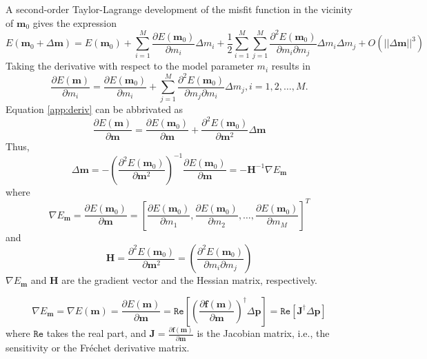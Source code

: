 A second-order Taylor-Lagrange development of the misfit function in the vicinity of $\textbf{m}_0$ gives the expression
\begin{equation}
E(\textbf{m}_0+\Delta \textbf{m})=E(\textbf{m}_0)
+\sum_{i=1}^M\frac{\partial E(\textbf{m}_0)}{\partial m_i}\Delta m_i
+\frac{1}{2}\sum_{i=1}^M\sum_{j=1}^M \frac{\partial^2 E(\textbf{m}_0)}{\partial m_i \partial m_j}\Delta m_i \Delta m_j+O(||\Delta\textbf{m}||^3)
\end{equation}
Taking the derivative with respect to the model parameter $m_i$ results in
\begin{equation}\label{app:deriv}
\frac{\partial E(\textbf{m})}{\partial m_i}=\frac{\partial E(\textbf{m}_0)}{\partial m_i}+\sum_{j=1}^M \frac{\partial^2 E(\textbf{m}_0)}{\partial m_j \partial m_i}\Delta m_j,
i=1,2,\ldots,M.
\end{equation}
Equation \eqref{app:deriv} can be abbrivated as
\begin{equation}
\frac{\partial E(\textbf{m})}{\partial \textbf{m}}=\frac{\partial E(\textbf{m}_0)}{\partial \textbf{m}}+\frac{\partial^2 E(\textbf{m}_0)}{\partial\textbf{m}^2}\Delta \textbf{m}
\end{equation}
Thus,
\begin{equation}\label{eq:deltam}
\Delta \textbf{m}=-\left(\frac{\partial^2 E(\textbf{m}_0)}{\partial\textbf{m}^2}\right)^{-1}\frac{\partial E(\textbf{m}_0)}{\partial \textbf{m}}=-\textbf{H}^{-1}\nabla E_{\textbf{m}}
\end{equation}
where 
\begin{equation}
\nabla E_{\textbf{m}}=\frac{\partial E(\textbf{m}_0)}{\partial \textbf{m}}=\left[
\frac{\partial E(\textbf{m}_0)}{\partial m_1},
\frac{\partial E(\textbf{m}_0)}{\partial m_2},
\ldots,
\frac{\partial E(\textbf{m}_0)}{\partial m_M}\right]^T
\end{equation}
and
\begin{equation}
\textbf{H}=\frac{\partial^2 E(\textbf{m}_0)}{\partial\textbf{m}^2}
=\left(\frac{\partial^2 E(\textbf{m}_0)}{\partial m_i\partial m_j}\right)
\end{equation}
$\nabla E_{\textbf{m}}$ and $\textbf{H}$ are the gradient vector and the Hessian matrix, respectively.


\begin{equation}\label{eq:grad}
\nabla E_{\textbf{m}}=\nabla E(\textbf{m})=\frac{\partial E(\textbf{m})}{\partial \textbf{m}}
=\mathtt{Re}\left[\left(\frac{\partial \textbf{f}(\textbf{m})}{\partial \textbf{m}}\right)^{\dagger}\Delta \textbf{p}\right]
=\mathtt{Re}\left[\textbf{J}^{\dagger}\Delta \textbf{p}\right]
\end{equation}
where $\mathtt{Re}$ takes the real part, and $\textbf{J}=\frac{\partial \textbf{f}(\textbf{m})}{\partial \textbf{m}}$ is the Jacobian matrix, i.e., the sensitivity or the Fréchet derivative matrix.


